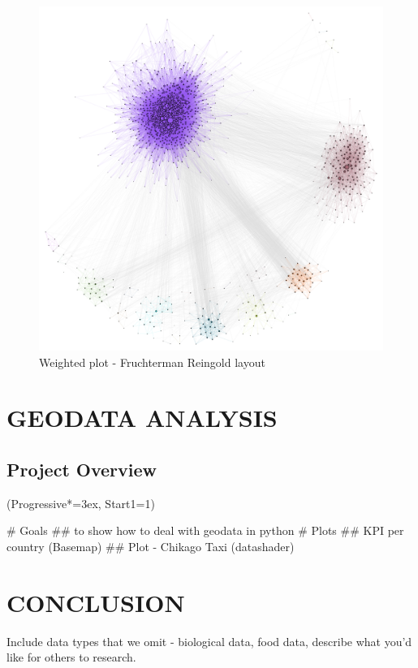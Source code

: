 \documentclass[12pt, a4paper]{article}
\let\OldEasylist\easylist
\let\OldEndEasylist\endeasylist
\renewenvironment{easylist}{%
    \OldEasylist%
    \ListProperties(Progressive*=3ex, Start1=1)%
}{%
    \OldEndEasylist%
}%
\begin{document}
\begin{figure}
    \centering
    \includegraphics[width=\textwidth]{src/youtube/hdg_weighted/hdg_pg_fg}
    \caption{Weighted plot - Fruchterman Reingold layout}
    \label{fig:hdg_pg_fg}
\end{figure}


\newpage
\section{GEODATA ANALYSIS}

\subsection{Project Overview}
\begin{easylist}
# Goals
## to show how to deal with geodata in python
# Plots
## KPI per country (Basemap)
 ## Plot - Chikago Taxi (datashader)
\end{easylist}


\newpage
\section{CONCLUSION}

Include data types that we omit - biological data, food data, describe what you'd like for others to research.

\newpage

\printbibliography[heading=bibnumbered, title={REFERENCES}]
\end{document}
